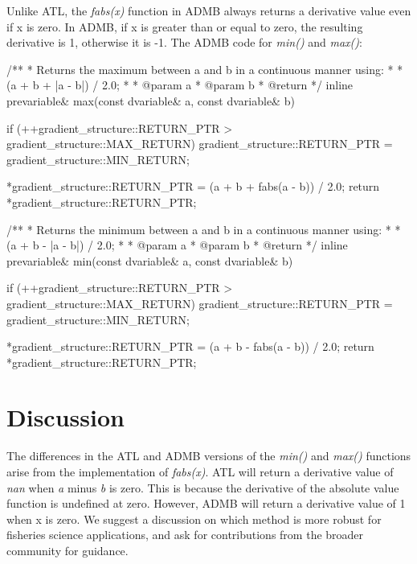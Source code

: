 \documentclass[oneside]{article}
\begin{document}
Unlike ATL, the \textit{fabs(x)} function in ADMB always returns a derivative value even if x is zero. In ADMB, if x is greater than or equal to zero, the resulting derivative is 1, otherwise it is -1.  The ADMB code for \textit{min()} and \textit{max()}:

\begin{cppsource}

/**
 * Returns the maximum between a and b in a continuous manner using:
 *
 * (a + b + |a - b|) / 2.0;
 *
 * @param a
 * @param b
 * @return
 */
inline prevariable& max(const dvariable& a, const dvariable& b) {
    if (++gradient_structure::RETURN_PTR > gradient_structure::MAX_RETURN)
        gradient_structure::RETURN_PTR = gradient_structure::MIN_RETURN;

    *gradient_structure::RETURN_PTR = (a + b + fabs(a - b)) / 2.0;
    return *gradient_structure::RETURN_PTR;
}


/**
 * Returns the minimum between a and b in a continuous manner using:
 *
 * (a + b - |a - b|) / 2.0;
 *
 * @param a
 * @param b
 * @return
 */
inline prevariable& min(const dvariable& a, const dvariable& b) {
    if (++gradient_structure::RETURN_PTR > gradient_structure::MAX_RETURN)
        gradient_structure::RETURN_PTR = gradient_structure::MIN_RETURN;

    *gradient_structure::RETURN_PTR = (a + b - fabs(a - b)) / 2.0;
    return *gradient_structure::RETURN_PTR;
}

\end{cppsource}



\section{Discussion}

The differences in the ATL and ADMB versions of the \textit{min()} and \textit{max()} functions arise from the implementation of \textit{fabs(x)}. ATL will return a derivative value of \textit{nan} when \textit{a} minus \textit{b} is zero. This is because the derivative of the absolute value function is undefined at zero. However, ADMB will return a derivative value of 1 when x is zero. We suggest a discussion on which method is more robust for fisheries science applications, and ask for contributions from the broader community for guidance.
\end{document}
